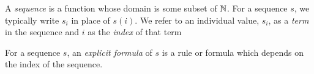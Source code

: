 \guard



\begin{defn}
\label{defn:sequence}
  A \emph{sequence} is a function whose domain is some subset of $\mathbb{N}$.
  For a sequence $s$, we typically write $s_i$ in place of $s(i)$.
  We refer to an individual value, $s_i$, as a \emph{term} in the sequence and $i$ as the \emph{index} of that term
\end{defn}

For a sequence $s$, an \emph{explicit formula} of $s$ is a rule or formula which depends on the index of the sequence.
